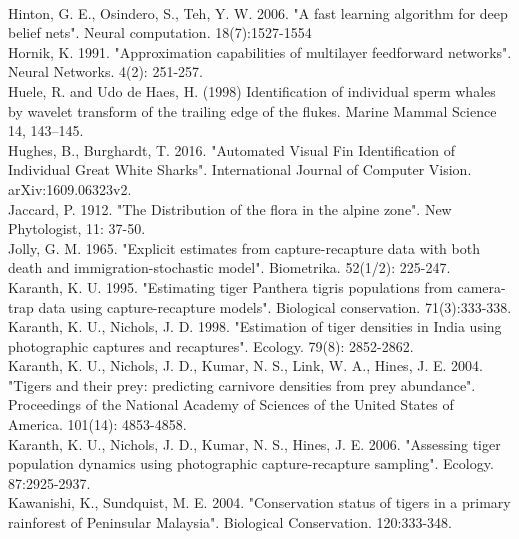 \documentclass[11pt]{article}
\begin{document}
\\
Hinton, G. E., Osindero, S., Teh, Y. W. 2006. "A fast learning algorithm for deep belief nets". Neural computation. 18(7):1527-1554
\newline
\\
Hornik, K. 1991. "Approximation capabilities of multilayer feedforward networks". Neural Networks. 4(2): 251-257.
\newline
\\
Huele, R. and Udo de Haes, H. (1998) Identification of individual sperm whales by wavelet transform of the trailing edge of the flukes. Marine Mammal Science 14, 143–145.
\newline
\\
Hughes, B., Burghardt, T. 2016. "Automated Visual Fin Identification of Individual Great White Sharks". International Journal of Computer Vision. arXiv:1609.06323v2.
\newline
\\
Jaccard, P. 1912. "The Distribution of the flora in the alpine zone". New Phytologist, 11: 37-50.
\newline
\\
Jolly, G. M. 1965. "Explicit estimates from capture-recapture data with both death and immigration-stochastic model". Biometrika. 52(1/2): 225-247.
\newline
\\
Karanth, K. U. 1995. "Estimating tiger Panthera tigris populations from camera-trap data using capture-recapture models". Biological conservation. 71(3):333-338.
\newline
\\
Karanth, K. U., Nichols, J. D. 1998. "Estimation of tiger densities in India using photographic captures and recaptures". Ecology. 79(8): 2852-2862.
\newline
\\
Karanth, K. U., Nichols, J. D., Kumar, N. S., Link, W. A., Hines, J. E. 2004. "Tigers and their prey: predicting carnivore densities from prey abundance". Proceedings of the National Academy of Sciences of the United States of America. 101(14): 4853-4858.
\newline
\\
Karanth, K. U., Nichols, J. D., Kumar, N. S., Hines, J. E. 2006. "Assessing tiger population dynamics using photographic capture-recapture sampling". Ecology. 87:2925-2937.
\newline
\\
Kawanishi, K., Sundquist, M. E. 2004. "Conservation status of tigers in a primary rainforest of Peninsular Malaysia". Biological Conservation. 120:333-348.
\end{document}
